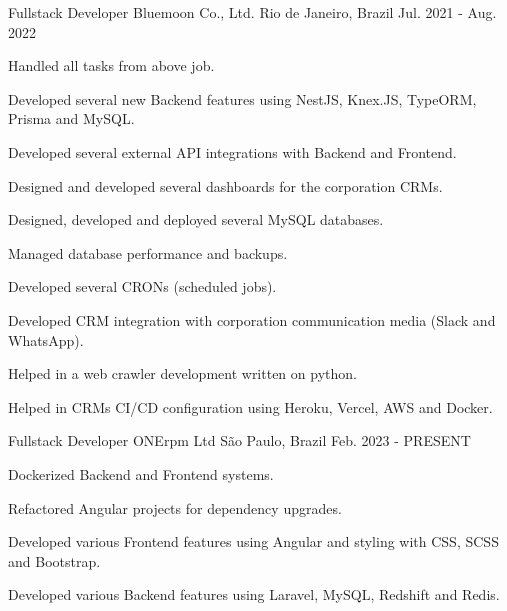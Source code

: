 \begin{cventries}
  \cventry
    {Fullstack Developer} %
    {Bluemoon Co., Ltd.} %
    {Rio de Janeiro, Brazil} %
    {Jul. 2021 - Aug. 2022} %
    {
      \begin{cvitems} %
        \item {Handled all tasks from above job.}
        \item {Developed several new Backend features using NestJS, Knex.JS, TypeORM, Prisma and MySQL.}
        \item {Developed several external API integrations with Backend and Frontend.}
        \item {Designed and developed several dashboards for the corporation CRMs.}
        \item {Designed, developed and deployed several MySQL databases.}
        \item {Managed database performance and backups.}
        \item {Developed several CRONs (scheduled jobs).}
        \item {Developed CRM integration with corporation communication media (Slack and WhatsApp).}
        \item {Helped in a web crawler development written on python.}
        \item {Helped in CRMs CI/CD configuration using Heroku, Vercel, AWS and Docker.}
      \end{cvitems}
    }

      \cventry
        {Fullstack Developer} %
        {ONErpm Ltd} %
        {São Paulo, Brazil} %
        {Feb. 2023 - PRESENT} %
        {
          \begin{cvitems} %
            \item {Dockerized Backend and Frontend systems.}
            \item {Refactored Angular projects for dependency upgrades.}
            \item {Developed various Frontend features using Angular and styling with CSS, SCSS and Bootstrap.}
            \item {Developed various Backend features using Laravel, MySQL, Redshift and Redis.}
          \end{cvitems}
        }

\end{cventries}
